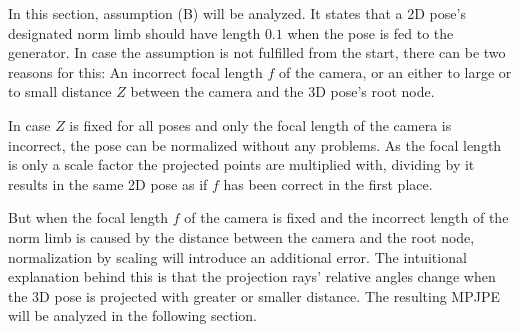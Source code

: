In this section, assumption (B) will be analyzed.
It states that a 2D pose's designated norm limb should have length $0.1$ when the pose is fed to the generator.
In case the assumption is not fulfilled from the start, there can be two reasons for this: 
An incorrect focal length $f$ of the camera, or an either to large or to small distance $Z$ between the camera and the 3D pose's root node.

In case $Z$ is fixed for all poses and only the focal length of the camera is incorrect, the pose can be normalized without any problems.
As the focal length is only a scale factor the projected points are multiplied with, dividing by it results in the same 2D pose as if $f$ has been correct in the first place.

But when the focal length $f$ of the camera is fixed and the incorrect length of the norm limb is caused by the distance between the camera and the root node, normalization by scaling will introduce an additional error.
The intuitional explanation behind this is that the projection rays' relative angles change when the 3D pose is projected with greater or smaller distance.
The resulting MPJPE will be analyzed in the following section.


